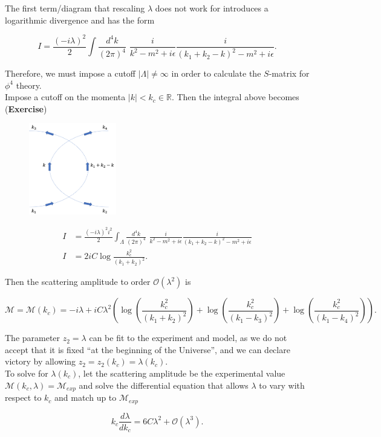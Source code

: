 \noindent The first term/diagram that rescaling $\lambda$ does not work for introduces a logarithmic divergence and has the form

\begin{equation}
I = \frac{(-i \lambda)^2}{2} \int \frac{d^4 k}{(2 \pi)^4} \,\, \frac{i}{k^2 - m^2 + i \epsilon} \frac{i}{(k_1 + k_2 - k)^2 - m^2 + i \epsilon}.
\end{equation}

\noindent Therefore, we must impose a cutoff $|\Lambda| \ne \infty$ in order to calculate the $S$-matrix for $\phi^4$ theory. \\

\noindent Impose a cutoff on the momenta $|k| < k_c \in \mathbb{R}$. Then the integral above becomes (\textbf{Exercise})

\begin{figure}[H]
	\centering
	\includegraphics[width=1.5in]{images/cutoff_log.png}
\end{figure}

\begin{align}
I &= \frac{(-i \lambda)^2 i^2}{2} \int_\Lambda \frac{d^4 k}{(2 \pi)^4} \,\, \frac{i}{k^2 - m^2 + i \epsilon} \frac{i}{(k_1 + k_2 - k)^2 - m^2 + i \epsilon} \\
I &= 2 i C \log{\frac{k_c^2}{(k_1 + k_2)^2}}.
\end{align}

\noindent Then the scattering amplitude to order $\mathcal{O} (\lambda^2)$ is

\begin{equation}
\mathcal{M} = \mathcal{M} (k_c) = -i \lambda + i C \lambda^2 \left( \log{\left(\frac{k_c^2}{(k_1 + k_2)^2}\right)} + \log{\left(\frac{k_c^2}{(k_1 - k_3)^2}\right)} + \log{\left(\frac{k_c^2}{(k_1 - k_4)^2}\right)} \right).
\end{equation}

\noindent The parameter $z_2 = \lambda$ can be fit to the experiment and model, as we do not accept that it is fixed ``at the beginning of the Universe'', and we can declare victory by allowing $z_2 = z_2 (k_c) = \lambda (k_c)$. \\

\noindent To solve for $\lambda(k_c)$, let the scattering amplitude be the experimental value $\mathcal{M}(k_c, \lambda) = \mathcal{M}_{exp}$ and solve the differential equation that allows $\lambda$ to vary with respect to $k_c$ and match up to $\mathcal{M}_{exp}$

\begin{equation}
k_c \frac{d \lambda}{d k_c} = 6 C \lambda^2 + \mathcal{O} (\lambda^3).
\end{equation}